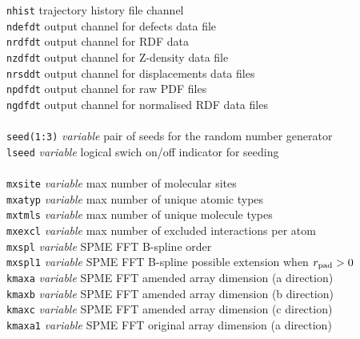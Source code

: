 \begin{tabbing}
\> {\tt nhist}                          \> trajectory history file channel \\
\> {\tt ndefdt}                         \> output channel for defects data file \\
\> {\tt nrdfdt}                         \> output channel for RDF data \\
\> {\tt nzdfdt}                         \> output channel for Z-density data file \\
\> {\tt nrsddt}                         \> output channel for displacements data files \\
\> {\tt npdfdt}                         \> output channel for raw PDF files \\
\> {\tt ngdfdt}                         \> output channel for normalised RDF data files \\
\>                   \>                      \> \\
\> {\tt seed(1:3)}   \> {\em variable}       \> pair of seeds for the random number generator \\
\> {\tt lseed}       \> {\em variable}       \> logical swich on/off indicator for seeding \\
\>                   \>                      \> \\
\> {\tt mxsite}      \> {\em variable}       \> max number of molecular sites \\
\> {\tt mxatyp}      \> {\em variable}       \> max number of unique atomic types \\
\> {\tt mxtmls}      \> {\em variable}       \> max number of unique molecule types \\
\> {\tt mxexcl}      \> {\em variable}       \> max number of excluded interactions per atom \\
\> {\tt mxspl}       \> {\em variable}       \> SPME FFT B-spline order \\
\> {\tt mxspl1}      \> {\em variable}       \> SPME FFT B-spline possible extension when $r_{\rm pad}>0$ \\
\> {\tt kmaxa}       \> {\em variable}       \> SPME FFT amended array dimension (a direction) \\
\> {\tt kmaxb}       \> {\em variable}       \> SPME FFT amended array dimension (b direction) \\
\> {\tt kmaxc}       \> {\em variable}       \> SPME FFT amended array dimension (c direction) \\
\> {\tt kmaxa1}      \> {\em variable}       \> SPME FFT original array dimension (a direction) \\

\end{tabbing}
